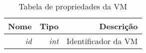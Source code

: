 \begin{table}[!htb]
    \centering
    \caption[Representação da VM]{Tabela de propriedades da VM
    \label{tab:constraint-shape}}
    \begin{tabular}{rrr}
        \toprule
            Nome & Tipo & Descrição \\ 
        \midrule
            \textit{id} & \textit{int} & Identificador da VM \\
        \bottomrule
    \end{tabular}
\end{table}


